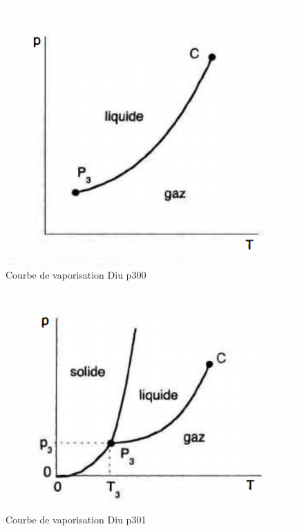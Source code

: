 \documentclass[10pt]{beamer}
\begin{document}
\begin{frame}{\insertsubsection}
    \begin{minipage}{.48\linewidth}
    \begin{figure}
        \centering
        \includegraphics[width=1\textwidth]{Courbe_vaporisation_Diu.png}
        \caption{Courbe de vaporisation Diu p300}
    \end{figure}
    \end{minipage}
    \begin{minipage}{.48\linewidth}
    \begin{figure}
        \centering
        \includegraphics[width=1.1\textwidth]{Diagramme_corps_purs.png}
        \caption{Courbe de vaporisation Diu p301}
    \end{figure}
\end{minipage}
\end{frame}
\end{document}

